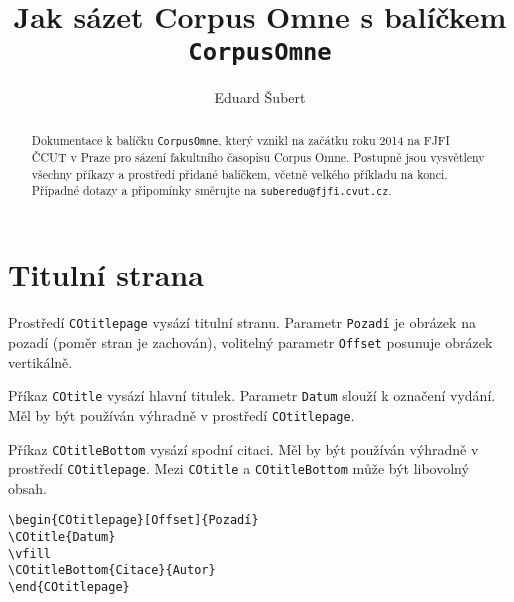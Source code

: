\documentclass{article}
\title{Jak sázet \textbf{Corpus Omne} s balíčkem \texttt{CorpusOmne}}
\author{Eduard Šubert}
\begin{document}
\maketitle

\begin{abstract}
Dokumentace k balíčku \texttt{CorpusOmne}, který vznikl na začátku roku 2014 na FJFI ČCUT v Praze pro sázení fakultního časopisu Corpus Omne. Postupně jsou vysvětleny všechny příkazy a prostředí přidané balíčkem, včetně velkého příkladu na konci. Případné dotazy a připomínky směrujte na \texttt{suberedu@fjfi.cvut.cz}.
\end{abstract}

\section{Titulní strana}%
Prostředí \texttt{COtitlepage} vysází titulní stranu. Parametr \texttt{Pozadí} je obrázek na pozadí (poměr stran je zachován), volitelný parametr \texttt{Offset} posunuje obrázek vertikálně.

Příkaz \texttt{COtitle} vysází hlavní titulek. Parametr \texttt{Datum} slouží k označení vydání. Měl by být používán výhradně v prostředí \texttt{COtitlepage}.

Příkaz \texttt{COtitleBottom} vysází spodní citaci. Měl by být používán výhradně v prostředí \texttt{COtitlepage}. 
Mezi \texttt{COtitle} a \texttt{COtitleBottom} může být libovolný obsah. 
\begin{verbatim}
\begin{COtitlepage}[Offset]{Pozadí}
\COtitle{Datum}
\vfill
\COtitleBottom{Citace}{Autor}
\end{COtitlepage}
\end{verbatim}
%
\end{document}
